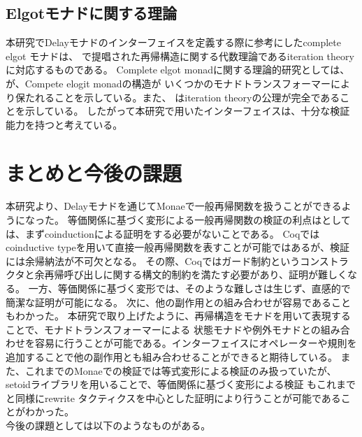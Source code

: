 \documentclass[japanese]{jssst_ppl}
\theoremstyle{definition}
\begin{document}
\subsection{Elgotモナドに関する理論}
本研究でDelayモナドのインターフェイスを定義する際に参考にしたcomplete elgot モナドは、
\cite{ddd}で提唱された再帰構造に関する代数理論であるiteration theoryに対応するものである。
Complete elgot monadに関する理論的研究としては、
\cite{ddd}が、Compete elogit monadの構造が
いくつかのモナドトランスフォーマーにより保たれることを示している。また、
\cite{ddd}はiteration theoryの公理が完全であることを示している。
したがって本研究で用いたインターフェイスは、十分な検証能力を持つと考えている。



\section{まとめと今後の課題}
本研究より、Delayモナドを通じてMonaeで一般再帰関数を扱うことができるようになった。
等価関係に基づく変形による一般再帰関数の検証の利点はとしては、まずcoinductionによる証明をする必要がないことである。
Coqではcoinductive typeを用いて直接一般再帰関数を表すことが可能ではあるが、検証には余帰納法が不可欠となる。
その際、Coqではガード制約というコンストラクタと余再帰呼び出しに関する構文的制約を満たす必要があり、証明が難しくなる。
一方、等価関係に基づく変形では、そのような難しさは生じず、直感的で簡潔な証明が可能になる。
次に、他の副作用との組み合わせが容易であることもわかった。
本研究で取り上げたように、再帰構造をモナドを用いて表現することで、モナドトランスフォーマーによる
状態モナドや例外モナドとの組み合わせを容易に行うことが可能である。インターフェイスにオペレーターや規則を追加することで他の副作用とも組み合わせることができると期待している。
また、これまでのMonaeでの検証では等式変形による検証のみ扱っていたが、setoidライブラリを用いることで、等価関係に基づく変形による検証
もこれまでと同様にrewrite タクティクスを中心とした証明により行うことが可能であることがわかった。\\
今後の課題としては以下のようなものがある。
\end{document}
